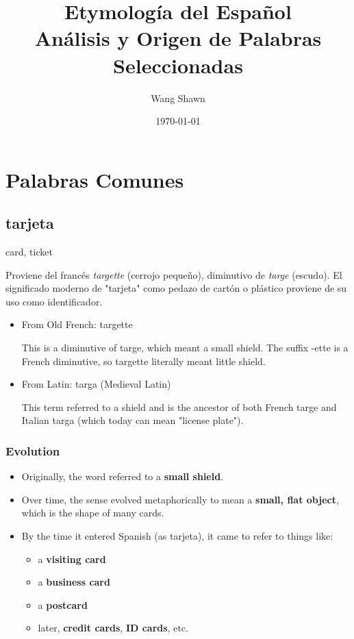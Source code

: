 \documentclass[10pt]{book}
\title{\Huge Etymología del Español\\\large Análisis y Origen de Palabras Seleccionadas}
\author{Wang Shawn}
\date{\today}
\newcommand{\wordentry}[2]{
	\large #1
	\vspace{-0.5em}
	\begin{etymologybox}
		#2
	\end{etymologybox}
}
\let\oldsection\section
\renewcommand{\section}[1]{
	\needspace{8\baselineskip}
	\oldsection{#1}
}
\begin{document}
	\maketitle
	
	\clearpage
	\tableofcontents
	
	\newpage
	
	
	\chapter{Palabras Comunes}
	
	\section{tarjeta}
	\wordentry{card, ticket}{
	Proviene del francés \textit{targette} (cerrojo pequeño), diminutivo de \textit{targe} (escudo). El significado moderno de "tarjeta" como pedazo de cartón o plástico proviene de su uso como identificador.
	\begin{itemize}
		\item From Old French: targette
		
		This is a diminutive of targe, which meant a small shield. The suffix -ette is a French diminutive, so targette literally meant little shield.
		
		\item From Latin: targa (Medieval Latin)
		
		This term referred to a shield and is the ancestor of both French targe and Italian targa (which today can mean "license plate").
	\end{itemize}
	}
	
	\subsection*{Evolution}
	
	\begin{itemize}
		\item Originally, the word referred to a \textbf{small shield}.
		\item Over time, the sense evolved metaphorically to mean a \textbf{small, flat object}, which is the shape of many cards.
		\item By the time it entered Spanish (as tarjeta), it came to refer to things like:
		\begin{itemize}
			\item a \textbf{visiting card}
			\item a \textbf{business card}
			\item a \textbf{postcard}
			\item later, \textbf{credit cards}, \textbf{ID cards}, etc.
		\end{itemize}
	\end{itemize}
	
\end{document}
